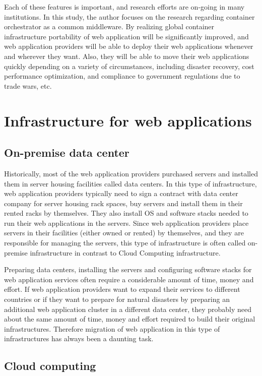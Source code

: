 Each of these features is important, and research efforts are on-going in many institutions.
In this study, the author focuses on the research regarding container orchestrator as a common middleware.
%
By realizing global container infrastructure portability of web application will be significantly improved, and web application providers will be able to deploy their web applications whenever and wherever they want.
Also, they will be able to move their web applications quickly depending on a variety of circumstances, including disaster recovery, cost performance optimization, and compliance to government regulations due to trade wars, etc.


\section{Infrastructure for web applications}

\subsection{On-premise data center}

Historically, most of the web application providers purchased servers and installed them in server housing facilities called data centers.
In this type of infrastructure, web application providers typically need to sign a contract with data center company for server housing rack spaces, buy servers and install them in their rented racks by themselves.
They also install OS and software stacks needed to run their web applications in the servers.
Since web application providers place servers in their facilities (either owned or rented) by themselves, and they are responsible for managing the servers, this type of infrastructure is often called on-premise infrastructure in contrast to Cloud Computing infrastructure.

Preparing data centers, installing the servers and configuring software stacks for web application services often require a considerable amount of time, money and effort.
If web application providers want to expand their services to different countries or if they want to prepare for natural disasters by preparing an additional web application cluster in a different data center, they probably need about the same amount of time, money and effort required to build their original infrastructures.
Therefore migration of web application in this type of infrastructures has always been a daunting task.

\subsection{Cloud computing}

